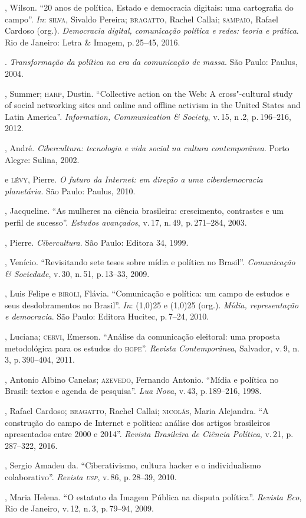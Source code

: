 \begin{bibliohedra}
, Wilson. ``20 anos de política, Estado e democracia digitais: uma
cartografia do campo''. \textit{In}: \textsc{silva}, Sivaldo Pereira; \textsc{bragatto}, Rachel Callai; \textsc{sampaio}, Rafael Cardoso (org.). \textit{Democracia
digital, comunicação política e redes: teoria e prática}. Rio
de Janeiro: Letra \& Imagem, p.\,25--45, 2016.

\titidem. \textit{Transformação da política na era da
comunicação de massa}. São Paulo: Paulus, 2004.

, Summer; \textsc{harp}, Dustin. ``Collective action on the Web: A
cross"-cultural study of social networking sites and online and offline
activism in the United States and Latin America''. \textit{Information,
Communication \& Society}, v.\,15, n\,.2, p.\,196--216, 2012.

, André. \textit{Cibercultura: tecnologia e vida social na
cultura contemporânea}. Porto Alegre: Sulina, 2002.

\titidem\mbox{} e \textsc{lévy}, Pierre. \textit{O futuro da Internet: em
direção a uma ciberdemocracia planetária}. São Paulo: Paulus, 2010.

, Jacqueline. ``As mulheres na ciência brasileira:
crescimento, contrastes e um perfil de sucesso''. \textit{Estudos
avançados}, v.\,17, n.\,49, p.\,271--284, 2003.

, Pierre. \textit{Cibercultura}. São Paulo: Editora 34, 1999.

, Venício. ``Revisitando sete teses sobre mídia e política
no Brasil''. \textit{Comunicação \& Sociedade}, v.\,30, n.\,51, p.\,13--33, 2009.

, Luis Felipe e \textsc{biroli}, Flávia. ``Comunicação e política: um campo
de estudos e seus desdobramentos no Brasil''. \textit{In}: \line(1,0){25} e
\line(1,0){25} (org.). \textit{Mídia, representação e democracia}.
São Paulo: Editora Hucitec, p.\,7--24, 2010.

, Luciana; \textsc{cervi}, Emerson. ``Análise da comunicação
eleitoral: uma proposta metodológica para os estudos do \textsc{hgpe}''.
\textit{Revista Contemporânea}, Salvador, v.\,9, n.\,3, p.\,390--404, 2011.

, Antonio Albino Canelas; \textsc{azevedo}, Fernando Antonio.
``Mídia e política no Brasil: textos e agenda de pesquisa''. \textit{Lua
Nova}, v.\,43, p.\,189--216, 1998.

, Rafael Cardoso; \textsc{bragatto}, Rachel Callai; \textsc{nicolás}, Maria
Alejandra. ``A construção do campo de Internet e política:
análise dos artigos brasileiros apresentados entre 2000 e 2014''.
\textit{Revista Brasileira de Ciência Política}, v.\,21, p.\,287--322, 2016.

, Sergio Amadeu da. ``Ciberativismo, cultura hacker e o
individualismo colaborativo''. \textit{Revista \textsc{usp}}, v.\,86, p.\,28--39, 2010.

, Maria Helena. ``O estatuto da Imagem Pública na disputa
política''. \textit{Revista Eco}, Rio de Janeiro, v.\,12, n.\,3, p.\,79--94, 2009.
\end{bibliohedra}
